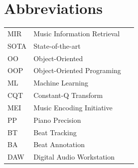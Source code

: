 \chapter*{Abbreviations}

\begin{flushleft}
\begin{tabular}{l p{0.8\linewidth}}
MIR      & Music Information Retrieval\\
SOTA & State-of-the-art\\
OO       & Object-Oriented \\
OOP      & Object-Oriented Programing\\
ML       & Machine Learning\\
CQT      & Constant-Q Transform\\
MEI      & Music Encoding Initiative\\ 
PP & Piano Precision\\ 
BT       & Beat Tracking\\ 
BA & Beat Annotation\\
DAW      & Digital Audio Workstation\\
       

\end{tabular}
\end{flushleft}
